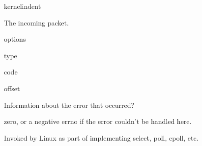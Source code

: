 \documentclass[letterpaper,10pt,english]{sphinxmanual}
\begin{document}
\begin{sphinxuseclass}{kernelindent}
\sphinxAtStartPar
{}
\begin{description}
\sphinxAtStartPar
The incoming packet.

\sphinxAtStartPar
options

\sphinxAtStartPar
type

\sphinxAtStartPar
code

\sphinxAtStartPar
offset

\sphinxAtStartPar
Information about the error that occurred?

\end{description}

\sphinxAtStartPar
{}

\sphinxAtStartPar
zero, or a negative errno if the error couldn’t be handled here.

\end{sphinxuseclass}

\begin{fulllineitems}
\label{\detokenize{mtpimpl.c:c.MTP_poll}}
\pysigstartsignatures
\pysigstartmultiline
{}
\pysigstopmultiline
\pysigstopsignatures
\sphinxAtStartPar
Invoked by Linux as part of implementing select, poll, epoll, etc.

\end{fulllineitems}
\end{document}
